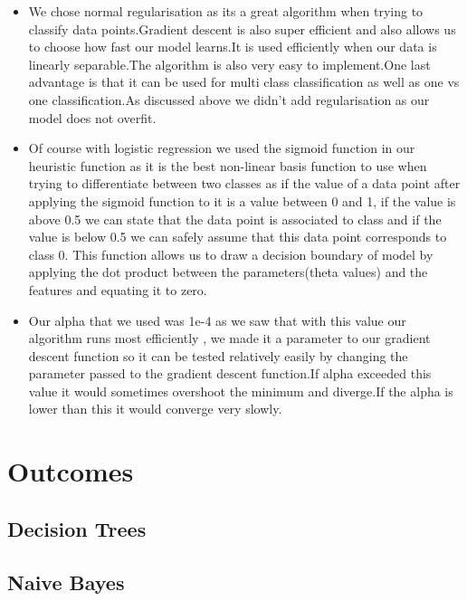 \documentclass{article}
\begin{document}
\begin{itemize}
    \item We chose normal regularisation as its a great algorithm when trying to classify data points.Gradient descent is also super efficient and also allows us to choose how fast our model learns.It is used efficiently when our data is linearly separable.The algorithm is also very easy to implement.One last advantage is that it can be used for multi class classification as well as one vs one classification.As discussed above we didn't add regularisation as our model does not overfit.
    \item Of course with logistic regression we used the sigmoid function in our heuristic function as it is the best non-linear basis function to use when trying to differentiate between two classes as if the value of a data point after applying the sigmoid function to it is a value between 0 and 1, if the value is above 0.5 we can state that the data point is associated to class and if the value is below 0.5 we can safely assume that this data point corresponds to class 0. This function allows us to draw a decision boundary of model by applying the dot product between the parameters(theta values) and the features and equating it to zero.
    \item Our alpha that we used was 1e-4 as we saw that with this value our algorithm runs most efficiently , we made it a parameter to our gradient descent function so it can be tested relatively easily by changing the parameter passed to the gradient descent function.If alpha exceeded this value it would sometimes overshoot the minimum and diverge.If the alpha is lower than this it would converge very slowly.
\end{itemize}







\section{Outcomes}
\subsection{Decision Trees}
\subsection{Naive Bayes}
\end{document}
